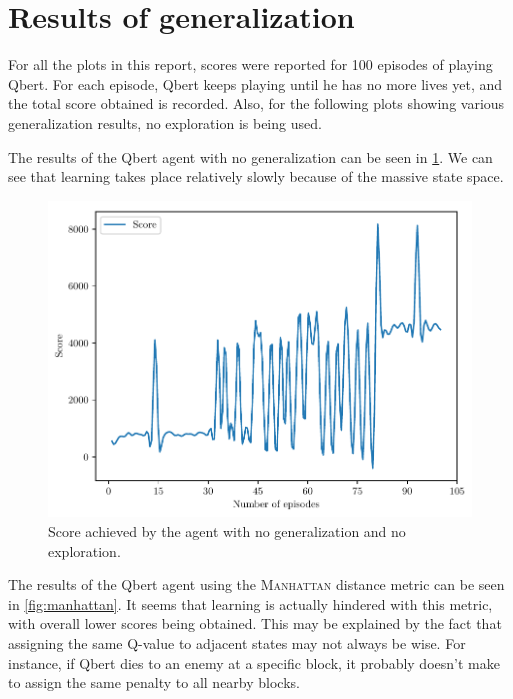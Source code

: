 \documentclass[a4paper,titlepage]{article}
\begin{document}
	\section{Results of generalization}
	
	For all the plots in this report, scores were reported for 100 episodes of playing Qbert. For each episode, Qbert keeps playing until he has no more lives yet, and the total score obtained is recorded. Also, for the following plots showing various generalization results, no exploration is being used.
	
	The results of the Qbert agent with no generalization can be seen in \cref{fig:no_generalization}. We can see that learning takes place relatively slowly because of the massive state space.
	
	\begin{figure}[!htb]
		\centering
		\includegraphics[width=\columnwidth]{plots/no_generalization.pdf}
		\caption
		{Score achieved by the agent with no generalization and no exploration.}
		\label{fig:no_generalization}
	\end{figure}

	The results of the Qbert agent using the \textsc{Manhattan} distance metric can be seen in \cref{fig:manhattan}. It seems that learning is actually hindered with this metric, with overall lower scores being obtained. This may be explained by the fact that assigning the same Q-value to adjacent states may not always be wise. For instance, if Qbert dies to an enemy at a specific block, it probably doesn't make to assign the same penalty to all nearby blocks.
\end{document}

